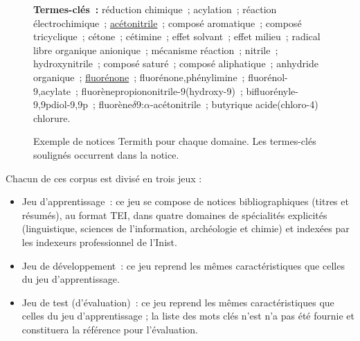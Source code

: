 \documentclass[10pt,twoside]{article}
\begin{document}
\begin{figure}
{{          \textbf{Termes-clés~:} réduction chimique~; acylation~; réaction
          électrochimique~; \underline{acétonitrile}~; composé aromatique~;
          composé tricyclique~; cétone~; cétimine~; effet solvant~; effet
          milieu~; radical libre organique anionique~; mécanisme réaction~;
          nitrile~; hydroxynitrile~; composé saturé~; composé aliphatique~;
          anhydride organique~; \underline{fluorénone}~;
          fluorénone,phénylimine~; fluorénol-9,acylate~;
          fluorènepropiononitrile-9(hydroxy-9)~; bifluorényle-9,9pdiol-9,9p~;
          fluorène$\delta$9:$\alpha$-acétonitrile~; butyrique acide(chloro-4)
          chlorure.
        }
      }
      \caption[Exemple de notices Termith]{
        Exemple de notices Termith pour chaque domaine. Les termes-clés soulignés occurrent dans la notice.
        \label{fig:example_inist}
      }
      \end{figure}
   
    Chacun de ces corpus est divisé en trois jeux :
\begin{itemize}
    \item Jeu d’apprentissage~: ce jeu se compose de notices bibliographiques (titres et résumés), au format TEI, dans quatre domaines de spécialités explicités (linguistique, sciences de l’information, archéologie et chimie) et indexées par les indexeurs professionnel de l’Inist.
    \item Jeu de développement~: ce jeu reprend les mêmes caractéristiques que celles du jeu d’apprentissage.
    \item Jeu de test (d’évaluation)~: ce jeu reprend les mêmes caractéristiques que celles du jeu d’apprentissage ; la liste des mots clés n’est n'a pas été fournie et constituera la référence pour l'évaluation.  
    \end{itemize}
     
\end{document}
